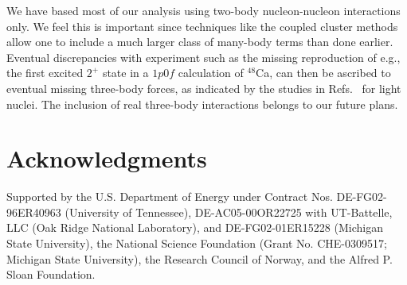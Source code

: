 \documentclass{ws-procs9x6}
\begin{document}
We have based most of our analysis 
using two-body nucleon-nucleon interactions only. 
We feel this is important since
techniques like the coupled cluster methods 
allow one to include a much larger
class of many-body terms than done earlier. Eventual discrepancies 
with experiment 
such as the missing reproduction of e.g., the first 
excited $2^+$ state in a $1p0f$ calculation
of $^{48}$Ca, can then be ascribed to eventual 
missing three-body forces, as indicated by the studies
in Refs.~\cite{petr_erich2002,bob1,bob2,bob3,apr98,petr_erich2003} 
for light nuclei. 
The inclusion of real three-body interactions belongs 
to our future plans.

 \section*{Acknowledgments}
 Supported by the U.S. Department of Energy
 under
 Contract Nos. DE-FG02-96ER40963 (University of Tennessee),
 DE-AC05-00OR22725 with UT-Battelle, LLC (Oak Ridge
 National Laboratory), and DE-FG02-01ER15228 (Michigan State University),
 the National Science Foundation (Grant No. CHE-0309517; Michigan State University),
 the Research Council of Norway, and the Alfred P. Sloan Foundation.
\end{document}
